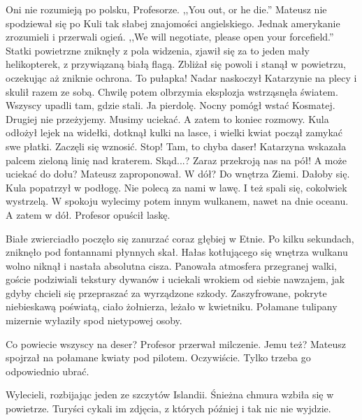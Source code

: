 \begin{dialogue}
\ds{} Oni nie rozumieją po polsku, Profesorze.
\ds{} ,,You out, or he die.'' \dm{} Mateusz nie spodziewał się po Kuli tak słabej znajomości angielskiego. Jednak amerykanie zrozumieli i przerwali ogień.
\ds{} ,,We will negotiate, please open your forcefield.'' \dm{} Statki powietrzne zniknęły z pola widzenia, zjawił się za to jeden mały helikopterek, z przywiązaną białą flagą.
Zbliżał się powoli i stanął w powietrzu, oczekując aż zniknie ochrona.
\ds{} To pułapka! \dm{} Nadar naskoczył Katarzynie na plecy i skulił razem ze sobą. Chwilę potem olbrzymia eksplozja wstrząsnęła światem. Wszyscy upadli tam, gdzie stali.
\ds{} Ja pierdolę. \dm{} Nocny pomógł wstać Kosmatej. \dm{} Drugiej nie przeżyjemy. Musimy uciekać.
\ds{} A zatem to koniec rozmowy. \dm{} Kula odłożył lejek na widełki, dotknął kulki na lasce, i wielki kwiat począł zamykać swe płatki. Zaczęli się wznosić.
\ds{} Stop! Tam, to chyba daser! \dm{} Katarzyna wskazała palcem zieloną linię nad kraterem.
\ds{} Skąd...?
\ds{} Zaraz przekroją nas na pół!
\ds{} A może uciekać do dołu? \dm{} Mateusz zaproponował.
\ds{} W dół?
\ds{} Do wnętrza Ziemi.
\ds{} Dałoby się. \dm{} Kula popatrzył w podłogę.
\ds{} Nie polecą za nami w lawę.
\ds{} I też spali się, cokolwiek wystrzelą.
\ds{} W spokoju wylecimy potem innym wulkanem, nawet na dnie oceanu.
\ds{} A zatem w dół. \dm{} Profesor opuścił laskę.
\end{dialogue}

Białe zwierciadło poczęło się zanurzać coraz głębiej w Etnie.
Po kilku sekundach, zniknęło pod fontannami płynnych skał.
Hałas kotłującego się wnętrza wulkanu wolno niknął i nastała absolutna cisza.
Panowała atmosfera przegranej walki, goście podziwiali tekstury dywanów i uciekali wrokiem od siebie nawzajem, jak gdyby chcieli się przepraszać za wyrządzone szkody.
Zaszyfrowane, pokryte niebieskawą poświatą, ciało żołnierza, leżało w kwietniku.
Połamane tulipany mizernie wyłaziły spod nietypowej osoby.

\begin{dialogue}
\ds{} Co powiecie wszyscy na deser? \dm{} Profesor przerwał milczenie.
\ds{} Jemu też? \dm{} Mateusz spojrzał na połamane kwiaty pod pilotem.
\ds{} Oczywiście. Tylko trzeba go odpowiednio ubrać.
\end{dialogue}

Wylecieli, rozbijając jeden ze szczytów Islandii.
Śnieżna chmura wzbiła się w powietrze.
Turyści cykali im zdjęcia, z których później i tak nic nie wyjdzie.

\divider{}

